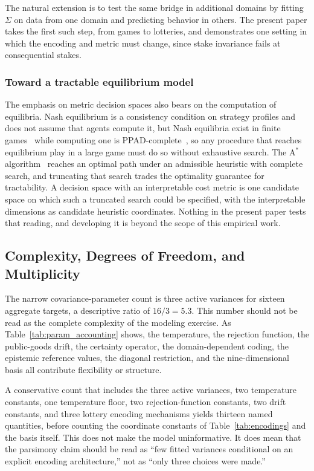 \documentclass[journal]{IEEEtran}
\begin{document}
The natural extension is to test the same bridge in additional domains by fitting $\Sigma$ on data from one domain and predicting behavior in others.
The present paper takes the first such step, from games to lotteries, and demonstrates one setting in which the encoding and metric must change, since stake invariance fails at consequential stakes.

\subsubsection*{Toward a tractable equilibrium model}
The emphasis on metric decision spaces also bears on the computation of equilibria.
Nash equilibrium is a consistency condition on strategy profiles and does not assume that agents compute it, but Nash equilibria exist in finite games~\cite{nash1950} while computing one is PPAD-complete~\cite{daskalakis2009,chen2009}, so any procedure that reaches equilibrium play in a large game must do so without exhaustive search.
The A$^{*}$ algorithm~\cite{hart1968} reaches an optimal path under an admissible heuristic with complete search, and truncating that search trades the optimality guarantee for tractability.
A decision space with an interpretable cost metric is one candidate space on which such a truncated search could be specified, with the interpretable dimensions as candidate heuristic coordinates.
Nothing in the present paper tests that reading, and developing it is beyond the scope of this empirical work.

\subsection{Complexity, Degrees of Freedom, and Multiplicity}

The narrow covariance-parameter count is three active variances for sixteen aggregate targets, a descriptive ratio of $16/3=5.3$.
This number should not be read as the complete complexity of the modeling exercise.
As Table~\ref{tab:param_accounting} shows, the temperature, the rejection function, the public-goods drift, the certainty operator, the domain-dependent coding, the epistemic reference values, the diagonal restriction, and the nine-dimensional basis all contribute flexibility or structure.

A conservative count that includes the three active variances, two temperature constants, one temperature floor, two rejection-function constants, two drift constants, and three lottery encoding mechanisms yields thirteen named quantities, before counting the coordinate constants of Table~\ref{tab:encodings} and the basis itself.
This does not make the model uninformative.
It does mean that the parsimony claim should be read as ``few fitted variances conditional on an explicit encoding architecture,'' not as ``only three choices were made.''
\end{document}
